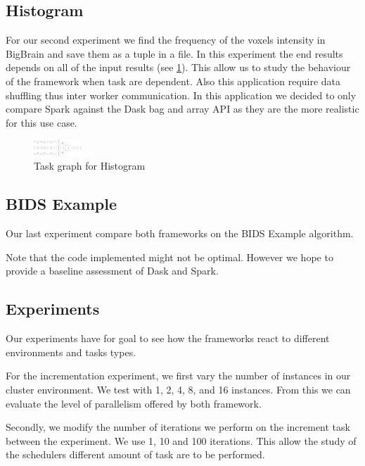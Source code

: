 \documentclass[11pt,a4paper]{article}
\begin{document}
\subsection{Histogram}
For our second experiment we find the frequency of the voxels intensity in BigBrain
and save them as a tuple in a file. In this experiment the end results depends on all
of the input results (see \ref{fig:tg-histo}). This allow us to study the behaviour
of the framework when task are dependent. Also this application require data
shuffling thus inter worker communication. In this application we decided to only
compare Spark against the Dask bag and array API as they are the more realistic for
this use case.

\begin{figure}[ht]
    \centering
    \includegraphics[width=0.16\textwidth, angle=-90]{images/histogram-task-graph.png}
    \caption{Task graph for Histogram}
    \label{fig:tg-histo}
\end{figure}

\subsection{BIDS Example}
Our last experiment compare both frameworks on the BIDS Example algorithm.

Note that the code implemented might not be optimal. However we hope to provide a
baseline assessment of Dask and Spark.

\subsection{Experiments}
Our experiments have for goal to see how the frameworks react to different
environments and tasks types.

For the incrementation experiment, we
first vary the number of instances in our cluster environment. We test with 1, 2, 4,
8, and 16 instances. From this we can evaluate the level of parallelism offered by
both framework.

Secondly, we modify the number of iterations we perform on the increment task between
the experiment. We use 1, 10 and 100 iterations. This allow the study of the
schedulers different amount of task are to be performed.
\end{document}
